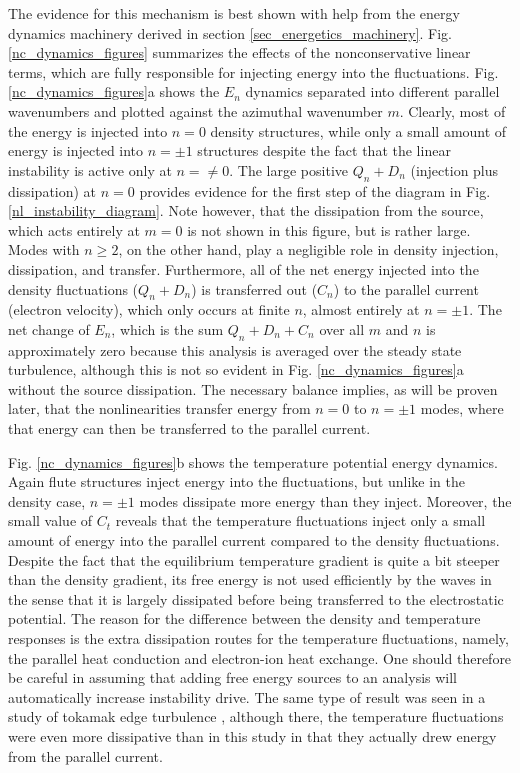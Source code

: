 \documentclass[showpacs,preprintnumbers,amsmath,amssymb,superscriptaddress]{revtex4}
\begin{document}
The evidence for this mechanism is best shown with
help from the energy dynamics machinery derived in section \ref{sec_energetics_machinery}. Fig. \ref{nc_dynamics_figures} summarizes the effects of the nonconservative linear terms, which are
fully responsible for injecting energy into the fluctuations. Fig. \ref{nc_dynamics_figures}a shows the $E_n$ dynamics separated into different parallel wavenumbers and plotted
against the azimuthal wavenumber $m$. Clearly, most of the energy is injected into $n=0$ density structures, while only a small amount of energy is injected into
$n= \pm 1$ structures despite the fact that the linear instability is active only at $n= \ne 0$. The large positive $Q_n + D_n$ (injection plus dissipation) at $n=0$ provides evidence for the first
step of the diagram in Fig. \ref{nl_instability_diagram}. Note however, that the dissipation from the source, which acts entirely at $m=0$ is not shown in this figure, but is rather large.
Modes with $n \ge 2$, on the other hand, play a negligible role in density injection, dissipation, and transfer. 
Furthermore, all of the net energy injected into the density fluctuations ($Q_n + D_n$) is transferred out ($C_n$) to
the parallel current (electron velocity), which only occurs at finite $n$, almost entirely at $n = \pm 1$. The net change of $E_n$, which is the sum $Q_n + D_n + C_n$ over all $m$ and $n$
is approximately zero because this analysis is averaged over the steady state turbulence, although this is not so evident in Fig. \ref{nc_dynamics_figures}a without the source dissipation. 
The necessary balance implies, as will be proven later, that the nonlinearities transfer energy from $n=0$ to $n = \pm 1$ modes, where that energy can then
be transferred to the parallel current.

Fig. \ref{nc_dynamics_figures}b shows the temperature potential energy dynamics. Again flute structures inject energy into the fluctuations, but unlike in the density case, $n = \pm 1$ modes
dissipate more energy than they inject. Moreover, the small value of $C_t$ reveals that the temperature fluctuations inject only a small amount of energy into the parallel current compared
to the density fluctuations. Despite the fact that the equilibrium temperature gradient is quite a bit steeper than the density gradient, its free energy is not used efficiently by the waves
in the sense that it is largely dissipated before being transferred to the electrostatic potential. The reason for the difference
between the density and temperature responses is the extra dissipation routes for the temperature fluctuations, namely, the parallel heat conduction and electron-ion heat exchange.
One should therefore be careful in assuming that adding free energy sources to an analysis will automatically increase instability drive.
The same type of result was seen in a study of tokamak edge turbulence \cite{zeiler1997}, although there, the temperature fluctuations were even more dissipative than in this study in that they
actually drew energy from the parallel current. 
\end{document}
